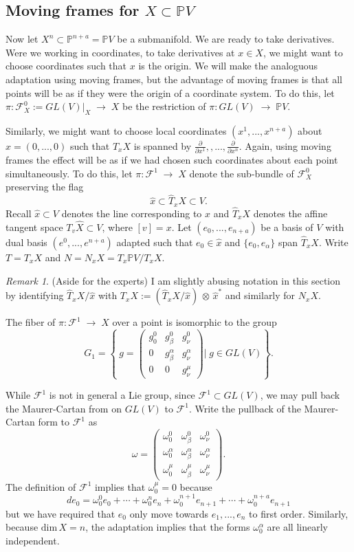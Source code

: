 \documentclass[11pt]{amsart}
\theoremstyle{definition}
\theoremstyle{remark}
\newtheorem{remark}[theorem]{Remark}
\numberwithin{equation}{section}
\def\na{n+\alpha}
\def\xx#1{x^{#1}}
\def\ooo#1#2{\omega^{#1}_{#2}}\def\xxx#1#2{x^{#1}_{#2}}
\def\oo#1{\omega^{#1}_0}
\def\ee#1{e_{#1}}
\def\ue#1{e^{#1}}
\def\cf{\mathcal F}
\def\BP{\mathbb P}
\def\pp#1{\mathbb P^{#1}}
\def\pp#1{{\mathbb P}^{#1}}
\def\tdim{\rm dim}
\def\hd{,...,}
\def\na{n+a}
\def\a{\alpha}
\def\ot{{\mathord{\,\otimes }\,}}
\def\ra{{\mathord{\;\rightarrow\;}}}
\def\tdim{\text{dim}\,}
\begin{document}
\subsection{Moving frames for $X\subset \BP V$}
Now let $X^n\subset\pp{n+a}=\BP V$ be a submanifold. We are ready to take derivatives. Were we working in coordinates, to take
derivatives at $x\in X$, we might want to choose coordinates such that
$x$ is the origin. We will make the analoguous adaptation using moving frames,
but the advantage of moving frames is that all points will be as if they were the origin of a coordinate
system. To do this, let $\pi : \cf^0_X := GL(V)|_X\ra X$ be the restriction
of $\pi : GL(V)\ra \BP V$.
 
\smallskip

Similarly, we might want to choose local coordinates $(\xx 1\hd \xx{n+a})$
about $x=(0\hd 0)$ such that $T_xX$ is spanned by $\frac\partial{\partial x^1},\hd\frac\partial{\partial
x^n}$.  Again,   using moving frames the effect will be as if we had
chosen such coordinates about each point simultaneously.
To do this,  let $\pi :\cf^1\ra X$ denote the sub-bundle of
$\cf^0_X$ preserving the flag
$$
\hat x\subset\hat T_xX\subset V.
$$
Recall $\hat x\subset V$ denotes the line corresponding to $x$ 
and $\hat T_xX$ denotes the affine tangent space $T_v\hat X\subset V$, where
$[v]=x$.  Let $(\ee 0\hd \ee\na)$ be a
basis of $V$ with dual basis $(\ue 0\hd \ue\na)$ adapted such that
$\ee 0\in \hat x$ and $\{\ee 0,\ee \a\}$ span $\hat T_xX$. 
Write $T=T_xX$ and $N=N_xX=T_x\BP V/T_xX$.
 
\begin{remark}(Aside for the experts)
I am slightly abusing notation in this section by
identifying $\hat T_xX/\hat x$ with $T_xX:= (\hat T_xX/\hat x)\ot \hat x^*$
and similarly for $N_xX$.
\end{remark}


The fiber of $\pi : \cf^1\ra X$ over a point is isomorphic to the
group
$$
G_1=\left\{
\ g = \begin{pmatrix} g^0_0 & g^0_{\beta} & g^0_{\nu} \\
0 &  g^{\alpha}_{\beta} & g^{\alpha}_{\nu} \\
0 &  0 & g^{\mu}_{\nu} \end{pmatrix} \Big|\; g\in GL(V)  \right\}.
$$
 
While $\cf^1$ is not in general a Lie group, since $\cf^1\subset
GL(V)$, we may pull back the Maurer-Cartan from on $GL(V)$ to $\cf^1$.
Write the pullback of the Maurer-Cartan form to $\cf^1$ as
$$
\omega=\begin{pmatrix}\oo 0 & \ooo 0\beta & \ooo 0\nu\\
\oo\alpha & \ooo\alpha\beta & \ooo\alpha\nu\\
\ooo\mu 0 & \ooo\mu\beta & \ooo\mu\nu\end{pmatrix} .
$$
The definition of $\cf^1$ implies that $\oo\mu =0$
because 
$$de_0=\oo 0e_0+\cdots +\oo ne_n+\oo{n+1}\ee{n+1}+\cdots +\oo\na e_{n+1}
$$
but we have required that $e_0$ only move towards $e_1\hd e_n$ to
first order. Similarly, because $\tdim X=n$, the adaptation implies that
the forms $\oo\a$ are all linearly independent.
\end{document}
